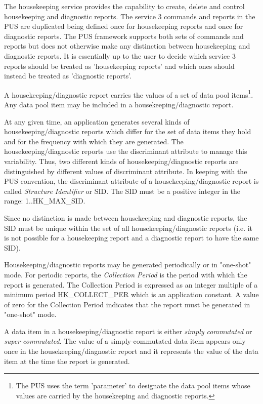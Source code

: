 \documentclass{pnp_article}
\begin{document}
The housekeeping service provides the capability to create, delete and control housekeeping and diagnostic reports. The service 3 commands and reports in the PUS are duplicated being defined once for housekeeping reports and once for diagnostic reports. The PUS framework supports both sets of commands and reports but does not otherwise make any distinction between housekeeping and diagnostic reports. It is essentially up to the user to decide which service 3 reports should be treated as 'housekeeping reports' and which ones should instead be treated as 'diagnostic reports'.

A housekeeping/diagnostic report carries the values of a set of data pool items\footnote{The PUS uses the term 'parameter' to designate the data pool items whose values are carried by the housekeeping and diagnostic reports.}. Any data pool item may be included in a housekeeping/diagnostic report. 

At any given time, an application generates several kinds of housekeeping/diagnostic reports which differ for the set of data items they hold and for the frequency with which they are generated. The housekeeping/diagnostic reports use the discriminant attribute to manage this variability. Thus, two different kinds of housekeeping/diagnostic reports are distinguished by different values of discriminant attribute. In keeping with the PUS convention, the discriminant attribute of a housekeeping/diagnostic report is called \textit{Structure Identifier} or SID. The SID must be a positive integer in the range: 1..HK\_MAX\_SID.

Since no distinction is made between housekeeping and diagnostic reports, the SID must be unique within the set of all housekeeping/diagnostic reports (i.e. it is not possible for a housekeeping report and a diagnostic report to have the same SID).

Housekeeping/diagnostic reports may be generated periodically or in "one-shot" mode. For periodic reports, the \textit{Collection Period} is the period with which the report is generated. The Collection Period is expressed as an integer multiple of a minimum period HK\_COLLECT\_PER which is an application constant. A value of zero for the Collection Period indicates that the report must be generated in "one-shot" mode.

A data item in a housekeeping/diagnostic report is either \textit{simply commutated} or \textit{super-commutated}. The value of a simply-commutated data item appears only once in the housekeeping/diagnostic report and it represents the value of the data item at the time the report is generated.
\end{document}
